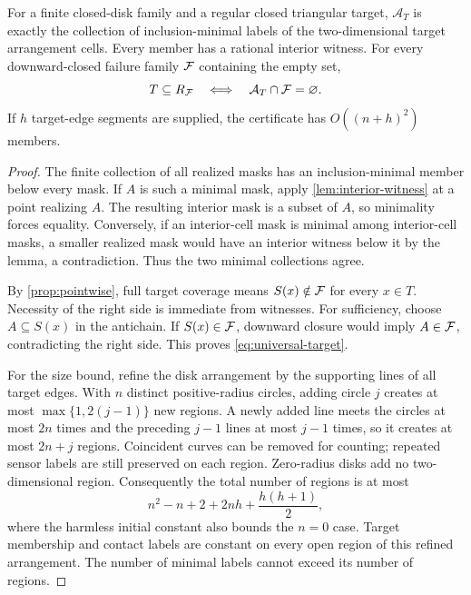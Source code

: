 \begin{theorem}\label{thm:universal}
For a finite closed-disk family and a regular closed triangular target, $\mathcal A_T$ is exactly the collection of inclusion-minimal labels of the two-dimensional target arrangement cells. Every member has a rational interior witness. For every downward-closed failure family $\mathcal F$ containing the empty set,
\begin{equation}\label{eq:universal-target}
T\subseteq R_{\mathcal F}\quad\Longleftrightarrow\quad
\mathcal A_T\cap\mathcal F=\varnothing.
\end{equation}
If $h$ target-edge segments are supplied, the certificate has $O((n+h)^2)$ members.
\end{theorem}
\begin{proof}
The finite collection of all realized masks has an inclusion-minimal member below every mask. If $A$ is such a minimal mask, apply \cref{lem:interior-witness} at a point realizing $A$. The resulting interior mask is a subset of $A$, so minimality forces equality. Conversely, if an interior-cell mask is minimal among interior-cell masks, a smaller realized mask would have an interior witness below it by the lemma, a contradiction. Thus the two minimal collections agree.

By \cref{prop:pointwise}, full target coverage means $S(x)\notin\mathcal F$ for every $x\in T$. Necessity of the right side is immediate from witnesses. For sufficiency, choose $A\subseteq S(x)$ in the antichain. If $S(x)\in\mathcal F$, downward closure would imply $A\in\mathcal F$, contradicting the right side. This proves \cref{eq:universal-target}.

For the size bound, refine the disk arrangement by the supporting lines of all target edges. With $n$ distinct positive-radius circles, adding circle $j$ creates at most $\max\{1,2(j-1)\}$ new regions. A newly added line meets the circles at most $2n$ times and the preceding $j-1$ lines at most $j-1$ times, so it creates at most $2n+j$ regions. Coincident curves can be removed for counting; repeated sensor labels are still preserved on each region. Zero-radius disks add no two-dimensional region. Consequently the total number of regions is at most
\begin{equation}\label{eq:arrangement-bound}
n^2-n+2+2nh+\frac{h(h+1)}2,
\end{equation}
where the harmless initial constant also bounds the $n=0$ case. Target membership and contact labels are constant on every open region of this refined arrangement. The number of minimal labels cannot exceed its number of regions.
\end{proof}

